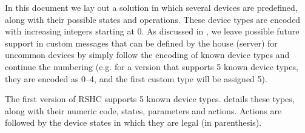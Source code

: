 In this document we lay out a solution in which several devices are predefined, along with their possible states and operations. These device types are encoded with increasing integers starting at 0. As discussed in , we leave possible future support in custom messages that can be defined by the house (server) for uncommon devices by simply follow the encoding of known device types and continue the numbering (e.g. for a version that supports 5 known device types, they are encoded as 0--4, and the first custom type will be assigned 5).

The first version of RSHC supports 5 known device types.  details these types, along with their numeric code, states, parameters and actions. Actions are followed by the device states in which they are legal (in parenthesis).

